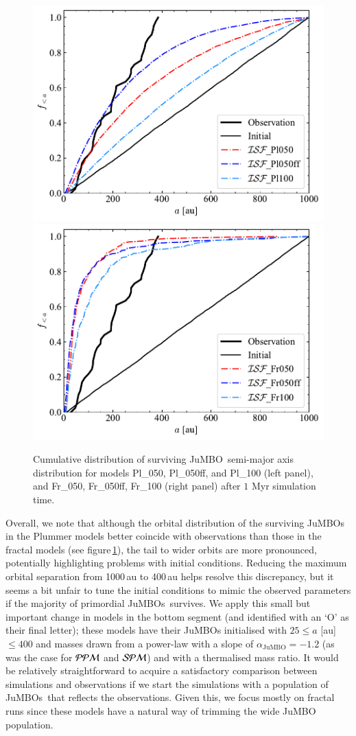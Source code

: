 \documentclass[submission,phys]{lib/SciPost}
\newcommand{\jumbo}{\mbox{JuMBO}}
\newcommand{\jumbos}{\mbox{JuMBOs}}
\begin{document}
\begin{figure}
    \centering
    \includegraphics[width=0.49\columnwidth]{figures/Plummer_General_sem_axis.pdf}
    \includegraphics[width=0.49\columnwidth]{figures/Fractal_General_sem_axis.pdf}
    \caption{Cumulative distribution of surviving \jumbo\, semi-major
      axis distribution for models Pl\_050, Pl\_050ff, and Pl\_100
      (left panel), and Fr\_050, Fr\_050ff, Fr\_100 (right panel) after $1$ Myr simulation time.}
    \label{Fig:Gen_Semi_Plummer}
    \label{Fig:Gen_Semi_Fractal}
\end{figure}

Overall, we note that although the orbital distribution of the
surviving \jumbos\, in the Plummer models better coincide with
observations than those in the fractal models (see
figure\,\ref{Fig:Gen_Semi_Fractal}), the tail to wider orbits are more
pronounced, potentially highlighting problems with initial conditions.
Reducing the maximum orbital separation from 1000\,au to 400\,au helps
resolve this discrepancy, but it seems a bit unfair to tune the
initial conditions to mimic the observed parameters if the majority of
primordial \jumbos\ survives.  We apply this small but important
change in models in the bottom segment (and identified with an `O' as
their final letter); these models have their JuMBOs initialised with
$25\leq a$ [au]$\leq 400$ and masses drawn from a power-law with a
slope of $\alpha_{\jumbo} =-1.2$ (as was the case for ${\cal PPM}$ and
${\cal SPM}$) and with a thermalised mass ratio.  It would be
relatively straightforward to acquire a satisfactory comparison
between simulations and observations if we start the simulations with
a population of \jumbos\, that reflects the observations. Given this,
we focus mostly on fractal runs since these models have a natural way
of trimming the wide JuMBO population.
      
\end{document}
